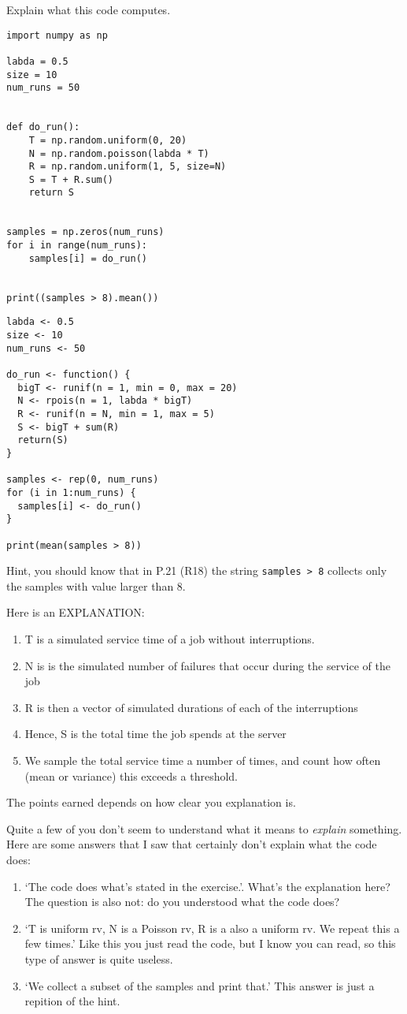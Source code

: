 \begin{exercise}[1.5]
Explain what  this code computes.
  \begin{verbatim}
import numpy as np

labda = 0.5
size = 10
num_runs = 50


def do_run():
    T = np.random.uniform(0, 20)
    N = np.random.poisson(labda * T)
    R = np.random.uniform(1, 5, size=N)
    S = T + R.sum()
    return S


samples = np.zeros(num_runs)
for i in range(num_runs):
    samples[i] = do_run()


print((samples > 8).mean())
  \end{verbatim}

  \begin{verbatim}
labda <- 0.5
size <- 10
num_runs <- 50

do_run <- function() {
  bigT <- runif(n = 1, min = 0, max = 20)
  N <- rpois(n = 1, labda * bigT)
  R <- runif(n = N, min = 1, max = 5)
  S <- bigT + sum(R)
  return(S)
}

samples <- rep(0, num_runs)
for (i in 1:num_runs) {
  samples[i] <- do_run()
}

print(mean(samples > 8))
\end{verbatim}

Hint, you should know that in P.21 (R18) the string \verb|samples > 8| collects only the samples with value larger than 8.

\begin{solution}
Here is an EXPLANATION:
  \begin{enumerate}
  \item T is a simulated service time of a job without interruptions.
  \item N is is the simulated number of failures that occur during the service of the job
  \item R is then a vector of simulated durations of each of the interruptions
  \item Hence, S is the total time the job spends at the server
  \item We sample the total service time a number of times, and count how often (mean or variance) this exceeds a threshold.
  \end{enumerate}
The points earned depends on how clear you explanation is.


Quite a few of you don't seem to understand what it means to \emph{explain} something. Here are some answers that I saw that certainly don't explain what the code does:
  \begin{enumerate}
  \item `The code does what's stated in the exercise.'.
    What's the explanation here?
    The question is also not: do you understood what the code does?
  \item  `T is uniform rv, N is a Poisson rv, R is a also a uniform rv. We repeat this a few times.' Like this you just read the code, but I know you can read, so this type of answer is quite useless.
  \item `We collect  a subset of the samples and print that.' This answer is just a repition of the hint.
  \end{enumerate}


\end{solution}
\end{exercise}
